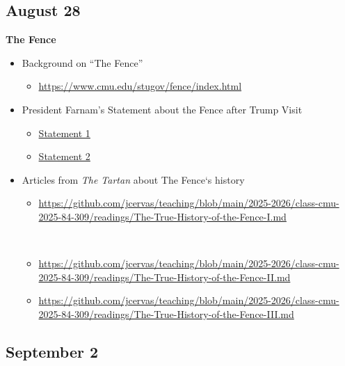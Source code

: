 \documentclass[]{tufte-handout}
\providecommand{\tightlist}{%
  \setlength{\itemsep}{0pt}\setlength{\parskip}{0pt}}
\begin{document}
\hypertarget{august-28}{%
\subsection{August 28}\label{august-28}}

\textbf{The Fence}

\begin{itemize}
\tightlist
\item
  Background on ``The Fence''

  \begin{itemize}
  \tightlist
  \item
    \url{https://www.cmu.edu/stugov/fence/index.html}
  \end{itemize}
\item
  President Farnam's Statement about the Fence after Trump Visit

  \begin{itemize}
  \tightlist
  \item
    \href{https://view.connect.cmu.edu/?qs=9827695e1300b223c66dc479ff67774b2636d3862de5ba00c9a33d4302a496ddcaf11df3a82f9e278459b95e9d5ee66d1142ed95ebf2e444469cb9e124411e4d6f6a1f56aec0be5427e909c8e70b5fdc}{Statement
    1}
  \item
    \href{https://view.connect.cmu.edu/?qs=d5ffef9eec97a8068120b2ae007393146e19f012eb1422f95848b0a34d534b2e1f9f223a78511d4e3a52621e5d0aa96979ac815d57172df6e4829d10878251adfa53d1d6402581641ffd4f9ec001f75b}{Statement
    2}
  \end{itemize}
\item
  Articles from \emph{The Tartan} about The Fence`s history

  \begin{itemize}
  \tightlist
  \item
    \url{https://github.com/jcervas/teaching/blob/main/2025-2026/class-cmu-2025-84-309/readings/The-True-History-of-the-Fence-I.md}\strut \\
  \item
    \url{https://github.com/jcervas/teaching/blob/main/2025-2026/class-cmu-2025-84-309/readings/The-True-History-of-the-Fence-II.md}
  \item
    \url{https://github.com/jcervas/teaching/blob/main/2025-2026/class-cmu-2025-84-309/readings/The-True-History-of-the-Fence-III.md}
  \end{itemize}
\end{itemize}

\hypertarget{september-2}{%
\subsection{September 2}\label{september-2}}
\end{document}
